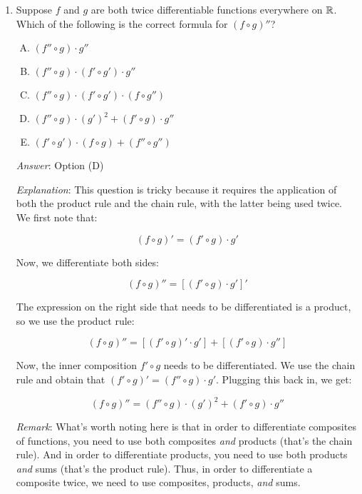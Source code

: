 \documentclass[10pt]{amsart}
\begin{document}
\begin{enumerate}
  {\em Performance review}: $20$ out of $26$ got this. $3$ each chose
  (B) and (C).

  {\em Historical note (last time)}: $10$ people got this correct. $11$ chose
  (C), which is a {\em sufficient} but not a necessary condition. $2$
  chose (B) and $1$ chose (D).

\item Suppose $f$ and $g$ are both twice differentiable functions
  everywhere on $\mathbb{R}$. Which of the following is the correct formula
  for $(f \circ g)''$?

  \begin{enumerate}[(A)]

  \item $(f'' \circ g) \cdot g''$
  \item $(f'' \circ g) \cdot (f' \circ g') \cdot g''$
  \item $(f'' \circ g) \cdot (f' \circ g') \cdot (f \circ g'')$
  \item $(f'' \circ g) \cdot (g')^2 + (f' \circ g) \cdot g''$
  \item $(f' \circ g') \cdot (f \circ g) + (f'' \circ g'')$
  \end{enumerate}

  {\em Answer}: Option (D)

  {\em Explanation}: This question is tricky because it requires the
  application of both the product rule and the chain rule, with the
  latter being used twice. We first note that:

  $$(f \circ g)' = (f' \circ g) \cdot g'$$

  Now, we differentiate both sides:

  $$(f \circ g)'' = [(f' \circ g) \cdot g']'$$

  The expression on the right side that needs to be differentiated is
  a product, so we use the product rule:

  $$(f \circ g)'' = [(f' \circ g)' \cdot g'] + [(f' \circ g) \cdot g'']$$

  Now, the inner composition $f' \circ g$ needs to be
  differentiated. We use the chain rule and obtain that $(f' \circ g)'
  = (f'' \circ g) \cdot g'$. Plugging this back in, we get:

  $$(f \circ g)'' = (f'' \circ g) \cdot (g')^2 + (f' \circ g) \cdot g''$$

  {\em Remark}: What's worth noting here is that in order to
  differentiate composites of functions, you need to use both
  composites {\em and} products (that's the chain rule). And in order
  to differentiate products, you need to use both products {\em and}
  sums (that's the product rule). Thus, in order to differentiate a
  composite twice, we need to use composites, products, {\em and}
  sums.


\end{enumerate}
\end{document}
